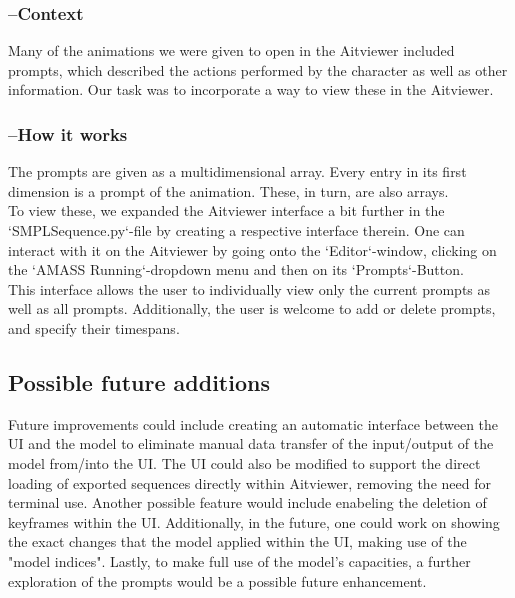\documentclass[a4paper]{scrartcl}
\begin{document}
\subsubsection*{--Context}
Many of the animations we were given to open in the Aitviewer included prompts, which described the actions performed by the character as well as other information. Our task was to incorporate a way to view these in the Aitviewer.

\subsubsection*{--How it works}
The prompts are given as a multidimensional array. Every entry in its first dimension is a prompt of the animation. These, in turn, are also arrays.\\
To view these, we expanded the Aitviewer interface a bit further in the `SMPLSequence.py`-file by creating a respective interface therein. One can interact with it on the Aitviewer by going onto the `Editor`-window, clicking on the `AMASS Running`-dropdown menu and then on its `Prompts`-Button.\\
This interface allows the user to individually view only the current prompts as well as all prompts. Additionally, the user is welcome to add or delete prompts, and specify their timespans.


\subsection*{Possible future additions}
Future improvements could include creating an automatic interface between the UI and the model to eliminate manual data transfer of the input/output of the model from/into the UI. The UI could also be modified to support the direct loading of exported sequences directly within Aitviewer, removing the need for terminal use. Another possible feature would include enabeling the deletion of keyframes within the UI. Additionally, in the future, one could work on showing the exact changes that the model applied within the UI, making use of the "model indices". Lastly, to make full use of the model's capacities, a further exploration of the prompts would be a possible future enhancement.
\end{document}
